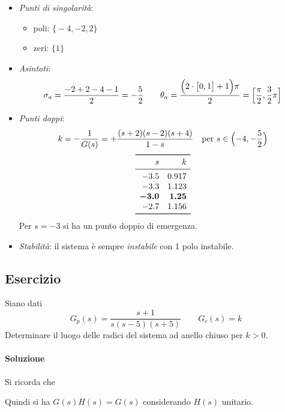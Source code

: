 \begin{itemize}
	\item \emph{Punti di singolarità}:
		\begin{itemize}
			\item poli: \(\bigl\{ -4,-2,2 \bigr\}\) \\
			\item zeri: \(\bigl\{ 1 \bigr\}\)
		\end{itemize}
	\item \emph{Asintoti}:
		\[
			\sigma_a = \frac{-2+2-4-1}{2} = -\frac{5}{2} \qquad
			\theta_a = \frac{\Bigl(2\cdot \bigl[0,1\bigr] +1\Bigr)\pi}{2} = \Bigl[ \frac{\pi}{2},\frac{3}{2}\pi \Bigr]
		\]
	\item \emph{Punti doppi}:
		\[
			k = -\frac{1}{G(s)} = + \frac{(s+2)(s-2)(s+4)}{1-s} \quad
			\text{per } s \in \Bigl(-4,-\frac{5}{2}\Bigr)
		\]
		\[\begin{array}{rr}
			\toprule
			s 	  & k 		\\
			\midrule
			-3.5 	  & 0.917 	\\
			-3.3 	  & 1.123 	\\
			\bm{-3.0} & \bm{1.25} 	\\
			-2.7 	  & 1.156	\\
			\bottomrule
		\end{array}\]
		Per \(s=-3\) si ha un punto doppio di emergenza.
	\item \emph{Stabilità}: il sistema è sempre \emph{instabile} con 1 polo instabile.
\end{itemize}


\subsection{Esercizio}
Siano dati
\[
	G_p(s) = \frac{s+1}{s(s-5)(s+5)} \qquad G_c(s) = k
\]
Determinare il luogo delle radici del sistema ad anello chiuso per \(k>0\).

\paragraph{Soluzione}

Si ricorda che
\begin{center}\end{center}
Quindi si ha \(G(s)H(s) = G(s)\) considerando \(H(s)\) unitario.

